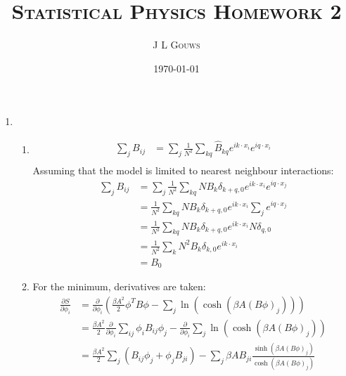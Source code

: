 \documentclass[12pt,a4]{article}
\title{
\textsc{Statistical Physics Homework 2}
}
\author{\textsc{J L Gouws}
}
\date{\today
\\[1cm]}
\begin{document}
\thispagestyle{empty}

\maketitle

\begin{enumerate}
  \item
    \begin{enumerate}
      \item
        \begin{align*}
          \sum_j B_{ij} 
                        &= \sum_{j}  \frac{1}{N^2} \sum_{k q} \hat B_{kq} e^{i k \cdot x_i} e^{i q \cdot x_i}\\
        \end{align*}
        Assuming that the model is limited to nearest neighbour interactions:
        \begin{align*}
          \sum_j B_{ij} 
                        &= \sum_{j}  \frac{1}{N^2} \sum_{k q} N B_k \delta_{k + q, 0} e^{i k \cdot x_i} e^{i q \cdot x_j}\\
                        &=   \frac{1}{N^2} \sum_{k q} N B_k \delta_{k + q, 0} e^{i k \cdot x_i} \sum_{j} e^{i q \cdot x_j}\\
                        &=   \frac{1}{N^2} \sum_{k q} N B_k \delta_{k + q, 0} e^{i k \cdot x_i} N \delta_{q,0}\\
                        &=   \frac{1}{N^2} \sum_{k} N^2 B_k \delta_{k, 0} e^{i k \cdot x_i} \\
                        &=   B_0 
        \end{align*}
      \item
        For the minimum, derivatives are taken:
        \begin{align*}
          \frac{\partial S}{\partial \phi_i} &= \frac{\partial }{\partial \phi_i}\left(\frac{\beta A^2}{2} \phi^T B \phi - \sum_j \ln(\cosh(\beta A (B \phi)_j))\right)\\
                                             &= \frac{\beta A^2}{2} \frac{\partial }{\partial \phi_i}\sum_{ij}\phi_i B_{ij} \phi_j - \frac{\partial }{\partial \phi_i}\sum_j \ln(\cosh(\beta A (B \phi)_j))\\
                                             &= \frac{\beta A^2}{2} \sum_{j} \left( B_{ij} \phi_j + \phi_jB_{ji} \right) - \sum_j \beta A B_{ji}\frac{\sinh(\beta A (B \phi)_j)}{\cosh(\beta A (B \phi)_j)}\\

\end{align*}
\end{enumerate}
\end{enumerate}
\end{document}
